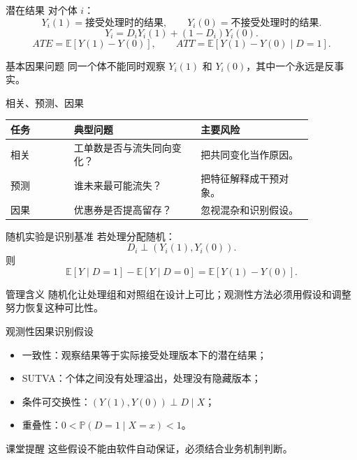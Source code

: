 \documentclass[UTF8,fontset=fandol,aspectratio=169,11pt]{ctexbeamer}
\begin{document}
\begin{frame}{潜在结果}
对个体 \(i\)：
\[
  Y_i(1)=\text{接受处理时的结果},
  \qquad
  Y_i(0)=\text{不接受处理时的结果}.
\]
\[
  Y_i=D_iY_i(1)+(1-D_i)Y_i(0).
\]
\[
  ATE=\mathbb E[Y(1)-Y(0)],
  \qquad
  ATT=\mathbb E[Y(1)-Y(0)\mid D=1].
\]
\begin{block}{基本因果问题}
同一个体不能同时观察 \(Y_i(1)\) 和 \(Y_i(0)\)，其中一个永远是反事实。
\end{block}
\end{frame}

\begin{frame}{相关、预测、因果}
\begin{center}
\begin{tabular}{p{0.18\linewidth}p{0.36\linewidth}p{0.32\linewidth}}
\toprule
任务 & 典型问题 & 主要风险\\
\midrule
相关 & 工单数是否与流失同向变化？ & 把共同变化当作原因。\\
预测 & 谁未来最可能流失？ & 把特征解释成干预对象。\\
因果 & 优惠券是否提高留存？ & 忽视混杂和识别假设。\\
\bottomrule
\end{tabular}
\end{center}
\end{frame}

\begin{frame}{随机实验是识别基准}
若处理分配随机：
\[
  D_i\perp (Y_i(1),Y_i(0)).
\]
则
\[
  \mathbb E[Y\mid D=1]-\mathbb E[Y\mid D=0]
  =
  \mathbb E[Y(1)-Y(0)].
\]
\begin{block}{管理含义}
随机化让处理组和对照组在设计上可比；观测性方法必须用假设和调整努力恢复这种可比性。
\end{block}
\end{frame}

\begin{frame}{观测性因果识别假设}
\begin{itemize}
  \item 一致性：观察结果等于实际接受处理版本下的潜在结果；
  \item SUTVA：个体之间没有处理溢出，处理没有隐藏版本；
  \item 条件可交换性：\((Y(1),Y(0))\perp D\mid X\)；
  \item 重叠性：\(0<\mathbb P(D=1\mid X=x)<1\)。
\end{itemize}
\begin{block}{课堂提醒}
这些假设不能由软件自动保证，必须结合业务机制判断。
\end{block}
\end{frame}
\end{document}
